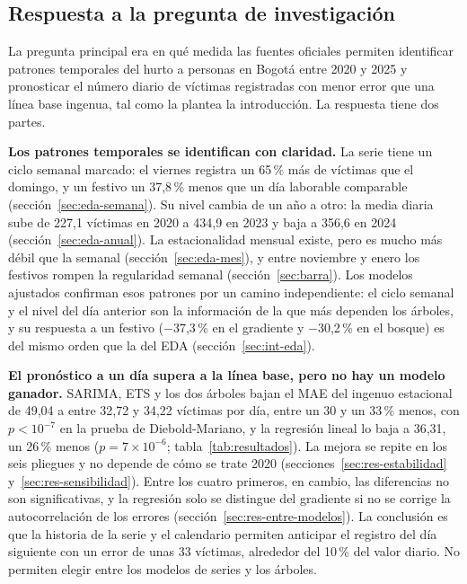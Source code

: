 \subsection{Respuesta a la pregunta de investigación}\label{sec:respuesta}

La pregunta principal era en qué medida las fuentes oficiales permiten identificar patrones temporales del hurto a personas en Bogotá entre 2020 y 2025 y pronosticar el número diario de víctimas registradas con menor error que una línea base ingenua, tal como la plantea la introducción. La respuesta tiene dos partes.

\textbf{Los patrones temporales se identifican con claridad.} La serie tiene un ciclo semanal marcado: el viernes registra un 65\,\% más de víctimas que el domingo, y un festivo un 37,8\,\% menos que un día laborable comparable (sección~\ref{sec:eda-semana}). Su nivel cambia de un año a otro: la media diaria sube de 227,1 víctimas en 2020 a 434,9 en 2023 y baja a 356,6 en 2024 (sección~\ref{sec:eda-anual}). La estacionalidad mensual existe, pero es mucho más débil que la semanal (sección~\ref{sec:eda-mes}), y entre noviembre y enero los festivos rompen la regularidad semanal (sección~\ref{sec:barra}). Los modelos ajustados confirman esos patrones por un camino independiente: el ciclo semanal y el nivel del día anterior son la información de la que más dependen los árboles, y su respuesta a un festivo ($-$37,3\,\% en el gradiente y $-$30,2\,\% en el bosque) es del mismo orden que la del EDA (sección~\ref{sec:int-eda}).

\textbf{El pronóstico a un día supera a la línea base, pero no hay un modelo ganador.} SARIMA, ETS y los dos árboles bajan el MAE del ingenuo estacional de 49,04 a entre 32,72 y 34,22 víctimas por día, entre un 30 y un 33\,\% menos, con $p < 10^{-7}$ en la prueba de Diebold-Mariano, y la regresión lineal lo baja a 36,31, un 26\,\% menos ($p = 7\times10^{-6}$; tabla~\ref{tab:resultados}). La mejora se repite en los seis pliegues y no depende de cómo se trate 2020 (secciones~\ref{sec:res-estabilidad} y~\ref{sec:res-sensibilidad}). Entre los cuatro primeros, en cambio, las diferencias no son significativas, y la regresión solo se distingue del gradiente si no se corrige la autocorrelación de los errores (sección~\ref{sec:res-entre-modelos}). La conclusión es que la historia de la serie y el calendario permiten anticipar el registro del día siguiente con un error de unas 33 víctimas, alrededor del 10\,\% del valor diario. No permiten elegir entre los modelos de series y los árboles.


